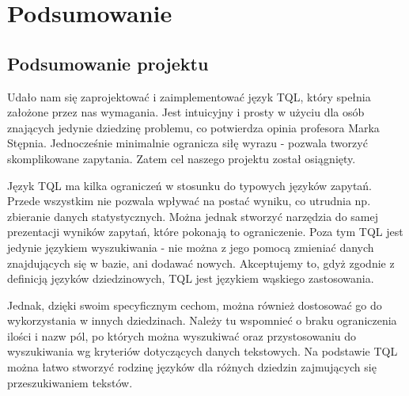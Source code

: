 \chapter*{Podsumowanie}
% 

\section*{Podsumowanie projektu}
Udało nam się zaprojektować i zaimplementować język TQL, który spełnia założone przez nas wymagania. Jest intuicyjny i prosty w użyciu dla osób znających jedynie dziedzinę problemu, co potwierdza opinia profesora Marka Stępnia. Jednocześnie minimalnie ogranicza siłę wyrazu - pozwala tworzyć skomplikowane zapytania. Zatem cel naszego projektu został osiągnięty.



Język TQL ma kilka ograniczeń w stosunku do typowych języków zapytań. Przede wszystkim nie pozwala wpływać na postać wyniku, co utrudnia np. zbieranie danych statystycznych. Można jednak stworzyć narzędzia do samej prezentacji wyników zapytań, które pokonają to ograniczenie. Poza tym TQL jest jedynie językiem wyszukiwania - nie można z jego pomocą zmieniać danych znajdujących się w bazie, ani dodawać nowych. Akceptujemy to, gdyż zgodnie z definicją języków dziedzinowych, TQL jest językiem wąskiego zastosowania.


Jednak, dzięki swoim specyficznym cechom, można również dostosować go do wykorzystania w innych dziedzinach. Należy tu wspomnieć o braku ograniczenia ilości i nazw pól, po których można wyszukiwać oraz przystosowaniu do wyszukiwania wg kryteriów dotyczących danych tekstowych. Na podstawie TQL można łatwo stworzyć rodzinę języków dla różnych dziedzin zajmujących się przeszukiwaniem tekstów.


